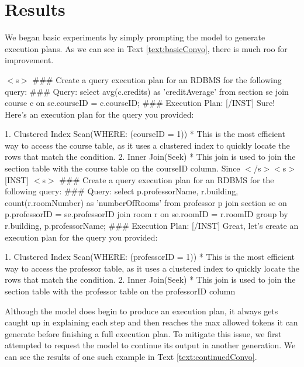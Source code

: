 \section{Results}
We began basic experiments by simply prompting the model to generate execution plans. As we can see in Text \ref{text:basicConvo}, there is much roo for improvement.

\begin{text}
  $<$s$>$ \#\#\# Create a query execution plan for an RDBMS for the following query: \#\#\# Query: select avg(c.credits) as 'creditAverage' from section se join course c on se.courseID = c.courseID; \#\#\# Execution Plan: [/INST]  Sure! Here's an execution plan for the query you provided:

  1. Clustered Index Scan(WHERE: (courseID = 1))
  * This is the most efficient way to access the course table, as it uses a clustered index to quickly locate the rows that match the condition.
  2. Inner Join(Seek)
  * This join is used to join the section table with the course table on the courseID column. Since $<$/s$>$$<$s$>$[INST] $<$s$>$ \#\#\# Create a query execution plan for an RDBMS for the following query: \#\#\# Query: select p.professorName, r.building, count(r.roomNumber) as 'numberOfRooms' from professor p join section se on p.professorID = se.professorID join room r on se.roomID = r.roomID group by r.building, p.professorName; \#\#\# Execution Plan: [/INST]  Great, let's create an execution plan for the query you provided:

  1. Clustered Index Scan(WHERE: (professorID = 1))
  * This is the most efficient way to access the professor table, as it uses a clustered index to quickly locate the rows that match the condition.
  2. Inner Join(Seek)
  * This join is used to join the section table with the professor table on the professorID column
  \caption{One of the earliest experiment's outputs}
  \label{text:basicConvo}
\end{text}

Although the model does begin to produce an execution plan, it always gets caught up in explaining each step and then reaches the max allowed tokens it can generate before finishing a full execution plan. To mitigate this issue, we first attempted to request the model to continue its output in another generation. We can see the results of one such example in Text \ref{text:continuedConvo}.

